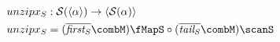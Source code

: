 \documentclass[preview]{standalone}
\begin{document}
\begin{align*}
  unzipx_S &: \mathcal{S}(\vect{\alpha}) \rightarrow \vect{\mathcal{S}(\alpha)} \\
  unzipx_S & = (\wrapdf{\mathit{first_S}} \combM) \fMapS \circ (\wrapdf{\mathit{tail_S}} \combM) \scanS
\end{align*}
\end{document}
